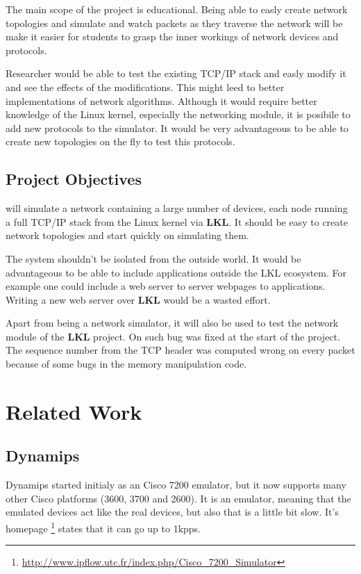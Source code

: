 The main scope of the project is educational. Being able to easly create network topologies
and simulate and watch packets as they traverse the network will be make it easier for students
to grasp the inner workings of network devices and protocols.

Researcher would be able to test the existing TCP/IP stack and easly modify it and see
the effects of the modifications. This might leed to better implementations of network
algorithms. Although it would require better knowledge of the Linux kernel, especially
the networking module, it is posibile to add new protocols to the simulator. It would
be very advantageous to be able to create new topologies on the fly to test this protocols.

\subsection{Project Objectives}
\label{sub-sec:proj-objectives}

\textbf{\project} will simulate a network containing a large number of devices, each node
running a full TCP/IP stack from the Linux kernel via \textbf{LKL}. It should be easy to create 
network topologies and start quickly on simulating them. 

The system shouldn't be isolated from the outside world. It would be advantageous to be able
to include applications outside the LKL ecosystem. For example one could include
a web server to server webpages to applications. Writing a new web server over \textbf{LKL} would
be a wasted effort.

Apart from being a network simulator, it will also be used to test the network module of the \textbf{LKL}
project. On such bug was fixed at the start of the project. The sequence number from the TCP header
was computed wrong on every packet because of some bugs in the memory manipulation code.

\section{Related Work}
\label{sec:proj-related}

\subsection{Dynamips}

Dynamips started initialy as an Cisco 7200 emulator, but it now supports many other
Cisco platforms (3600, 3700 and 2600). It is an emulator, meaning that the emulated
devices act like the real devices, but also that is a little bit slow. It's
homepage \footnote{\url{http://www.ipflow.utc.fr/index.php/Cisco_7200_Simulator}}
states that it can go up to 1kpps. 

